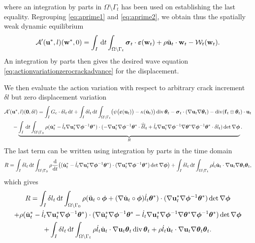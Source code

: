 where an integration by parts in $\Omega\setminus\Gamma_t$ has been used on establishing the last equality. Regrouping \eqref{eq:aprime1} and \eqref{eq:aprime2}, we obtain thus the spatially weak dynamic equilibrium
\begin{equation} \label{eq:spatiallyweakdyneq}
\mathcal{A}'(\vec{u}^*,l)(\vec{w}^*,0)=\int_I\D{t}\int_\domaint\sig_t\cdot\eps(\vec{w}_t)+\rho\ddot{\vec{u}}_t\cdot\vec{w}_t-\mathcal{W}_t(\vec{w}_t).
\end{equation}
An integration by parts then gives the desired wave equation \eqref{eq:actionvariationzerocrackadvance} for the displacement.

We then evaluate the action variation with respect to arbitrary crack increment $\delta l$ but zero displacement variation
\begin{multline} \label{eq:aprime3}
\mathcal{A}'(\vec{u}^*,l)(\vec{0},\delta l)=\int_I\gc\cdot\delta l_t\D{t}+\int_I\delta l_t\D{t}\int_\domaint\bigl(\psi\bigl(\eps(\vec{u}_t)\bigr)-\kappa(\dot{\vec{u}}_t)\bigr)\div\vtheta_t-\sig_t\cdot(\nabla\vec{u}_t\nabla\vtheta_t)-\div(\vec{f}_t\otimes\vtheta_t)\cdot\vec{u}_t \\
-\underbrace{\int_I\D{t}\int_\domaini\rho(\dot{\vec{u}}^*_t-\dot{l}_t\nabla\vec{u}^*_t\nabla\philt^{-1}\vtheta^*)\cdot(-\nabla\vec{u}_t^*\nabla\philt^{-1}\vtheta^*\cdot\dot{\overline{\delta l}}_t+\dot{l}_t\nabla\vec{u}_t^*\nabla\philt^{-1}\nabla\vtheta^*\nabla\philt^{-1}\vtheta^*\cdot\delta l_t)\det\nabla\philt}_R.
\end{multline}
The last term can be written using integration by parts in the time domain
\[
R=\int_I\delta l_t\D{t}\int_\domaini\rho\frac{\md}{\md t}\bigl((\dot{\vec{u}}^*_t-\dot{l}_t\nabla\vec{u}^*_t\nabla\philt^{-1}\vtheta^*)\cdot(\nabla\vec{u}_t^*\nabla\philt^{-1}\vtheta^*)\det\nabla\philt\bigr)+\int_I\delta l_t\D{t}\int_\domaint\rho\dot{l}_t\dot{\vec{u}}_t\cdot\nabla\vec{u}_t\nabla\vtheta_t\vtheta_t,
\]
which gives
\begin{multline*}
R=\int_I\delta l_t\D{t}\int_\domaini\rho(\ddot{\vec{u}}_t\circ\philt+(\nabla\dot{\vec{u}}_t\circ\philt)\dot{l}_t\vtheta^*)\cdot(\nabla\vec{u}_t^*\nabla\philt^{-1}\vtheta^*)\det\nabla\philt \\
+\rho(\dot{\vec{u}}^*_t-\dot{l}_t\nabla\vec{u}^*_t\nabla\philt^{-1}\vtheta^*)\cdot(\nabla\dot{\vec{u}}^*_t\nabla\philt^{-1}\vtheta^*-\dot{l}_t\nabla\vec{u}^*_t\nabla\philt^{-1}\nabla\vtheta^*\nabla\philt^{-1}\vtheta^*)\det\nabla\philt \\
+\int_I\delta l_t\D{t}\int_\domaint\rho\dot{l}_t\dot{\vec{u}}_t\cdot\nabla\vec{u}_t\vtheta_t\div\vtheta_t+\rho\dot{l}_t\dot{\vec{u}}_t\cdot\nabla\vec{u}_t\nabla\vtheta_t\vtheta_t.
\end{multline*}
